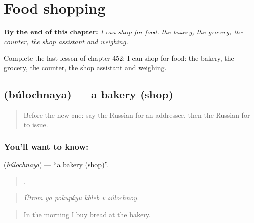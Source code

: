 
\chapter{Food shopping}
\label{ch:ru-food-shopping}

\begin{chapteropening}
\textbf{By the end of this chapter:} \emph{I can shop for food: the bakery, the grocery, the counter, the shop assistant and weighing.}

Complete the last lesson of chapter 452: I can shop for food: the bakery, the grocery, the counter, the shop assistant and weighing.
\end{chapteropening}

\section[\texorpdfstring{\ru{булочная} (búlochnaya)}{булочная (búlochnaya)}]{ (búlochnaya) — a bakery (shop)}

\label{lesson:RU-C452-bulochnaya}



\begin{quote}
Before the new one: say the Russian for an addressee, then the Russian for to issue.
\end{quote}

\subsection*{You'll want to know: }
\textbf{} (\emph{búlochnaya}) — \textquotedblleft{}a bakery (shop)\textquotedblright{}.

\begin{quote}
     .
\end{quote}

\begin{quote}
\emph{Útrom ya pokupáyu khleb v búlochnoy.}
\end{quote}

\begin{quote}
In the morning I buy bread at the bakery.
\end{quote}

